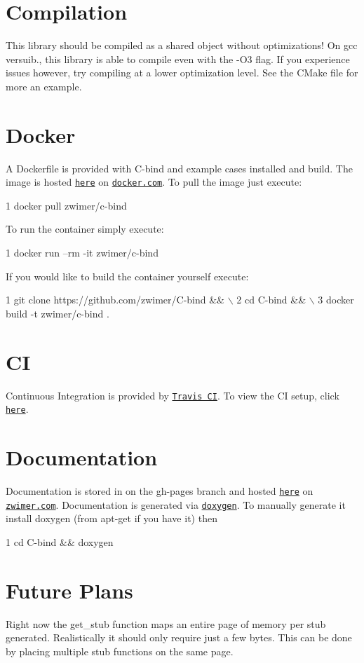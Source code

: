 \section*{Compilation}

This library should be compiled as a shared object without optimizations! On {\ttfamily gcc} versuib{.}, this library is able to compile even with the {\ttfamily -\/\+O3} flag. If you experience issues however, try compiling at a lower optimization level. See the {\ttfamily C\+Make} file for more an example.

\section*{Docker}

A {\ttfamily Dockerfile} is provided with {\ttfamily C-\/bind} and example cases installed and build. The image is hosted \href{https://cloud.docker.com/repository/docker/zwimer/c-bind}{\tt here} on \href{https://docker.com}{\tt docker.\+com}. To pull the image just execute\+: 
\begin{DoxyCode}
1 docker pull zwimer/c-bind
\end{DoxyCode}
 To run the container simply execute\+: 
\begin{DoxyCode}
1 docker run --rm -it zwimer/c-bind
\end{DoxyCode}
 If you would like to build the container yourself execute\+: 
\begin{DoxyCode}
1 git clone https://github.com/zwimer/C-bind && \(\backslash\)
2 cd C-bind && \(\backslash\)
3 docker build -t zwimer/c-bind .
\end{DoxyCode}


\section*{CI}

Continuous Integration is provided by \href{https://travis-ci.org}{\tt Travis CI}. To view the CI setup, click \href{https://travis-ci.org/zwimer/C-bind/}{\tt here}.

\section*{Documentation}

Documentation is stored in on the {\ttfamily gh-\/pages} branch and hosted \href{https://zwimer.github.io/C-bind/docs/html/index.html}{\tt here} on \href{https://zwimer.com}{\tt zwimer.\+com}. Documentation is generated via \href{http://www.doxygen.nl/}{\tt doxygen}. To manually generate it install doxygen (from {\ttfamily apt-\/get} if you have it) then 
\begin{DoxyCode}
1 cd C-bind && doxygen
\end{DoxyCode}


\section*{Future Plans}


\begin{DoxyEnumerate}
\item Right now the {\ttfamily get\+\_\+stub} function maps an entire page of memory per stub generated. Realistically it should only require just a few bytes. This can be done by placing multiple stub functions on the same page. 
\end{DoxyEnumerate}
